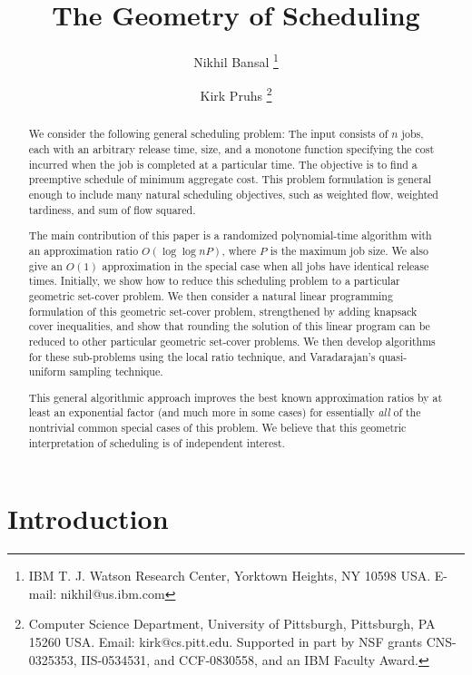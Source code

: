 \documentclass[11pt]{article}
\begin{document}
\title{The Geometry of Scheduling}
\author{
Nikhil Bansal
\thanks{IBM T. J. Watson Research Center,
Yorktown Heights, NY 10598 USA.
E-mail: nikhil@us.ibm.com}
\and
 Kirk Pruhs 
 \thanks{
Computer Science Department, 
University of Pittsburgh, 
Pittsburgh, PA 15260 USA.
Email: kirk@cs.pitt.edu.
Supported in part by
NSF grants CNS-0325353,  IIS-0534531, and CCF-0830558, and
an IBM Faculty Award.} 
} 
\date{}
\maketitle

\begin{abstract}
We consider the following general scheduling problem: 
The input consists of $n$ jobs, each with an arbitrary release time,
size, and a monotone function 
specifying the cost incurred when the job is completed at a particular time.
The objective is to find a preemptive schedule of minimum aggregate cost.
This problem formulation is general enough to include many natural scheduling 
objectives, such as weighted flow, weighted tardiness, and sum of flow squared.

The main contribution of this paper 
is a randomized polynomial-time algorithm with an approximation ratio 
$O(\log \log nP )$,
where $P$ is the maximum job size.
We also give an $O(1)$ approximation in the special case when all jobs have identical release times.
Initially, we show how to reduce this scheduling problem
to a particular geometric set-cover problem.
We then consider a natural linear programming formulation of this geometric set-cover problem, 
strengthened by adding knapsack cover inequalities,
and show that rounding the solution of this linear program can be reduced to 
other particular geometric set-cover problems.
We then develop algorithms for these sub-problems using the local ratio technique,
and Varadarajan's quasi-uniform sampling technique.

This general algorithmic approach improves the best known approximation ratios by at least an 
exponential factor (and much more in some cases) for essentially 
{\em all} of the nontrivial common special cases of this problem.
We believe that this geometric interpretation of scheduling 
is of independent interest.
\end{abstract}



\section{Introduction}
\end{document}
